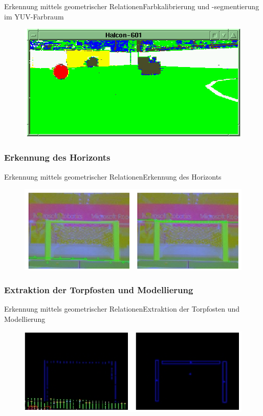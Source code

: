 \documentclass{beamer}
\begin{document}
\begin{frame}{Erkennung mittels geometrischer Relationen}{Farbkalibrierung und -segmentierung im YUV-Farbraum}
\begin{figure}[htp]
\centering
\includegraphics[scale=0.5]{segmented-view.png}
\end{figure}
\end{frame}

\subsubsection{Erkennung des Horizonts}
\begin{frame}{Erkennung mittels geometrischer Relationen}{Erkennung des Horizonts}
\begin{figure}[htp]
\centering
\includegraphics[scale=0.6]{geometric-plane.png}
\end{figure}
\end{frame}

\subsubsection{Extraktion der Torpfosten und Modellierung}
\begin{frame}{Erkennung mittels geometrischer Relationen}{Extraktion der Torpfosten und Modellierung}
\begin{figure}[htp]
\centering
\includegraphics[scale=0.6]{goal-blobs.png}
\end{figure}
\end{frame}
\end{document}
